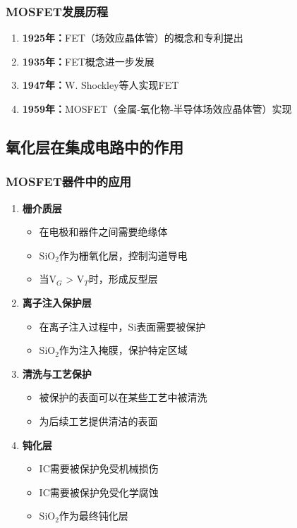 \documentclass[UTF8,12pt,a4paper]{ctexart}
\begin{document}
\subsubsection{MOSFET发展历程}

\begin{enumerate}
    \item \textbf{1925年：}FET（场效应晶体管）的概念和专利提出
    \item \textbf{1935年：}FET概念进一步发展
    \item \textbf{1947年：}W. Shockley等人实现FET
    \item \textbf{1959年：}MOSFET（金属-氧化物-半导体场效应晶体管）实现
\end{enumerate}

\subsection{氧化层在集成电路中的作用}

\subsubsection{MOSFET器件中的应用}

\begin{enumerate}
    \item \textbf{栅介质层}
    \begin{itemize}
        \item 在电极和器件之间需要绝缘体
        \item SiO$_2$作为栅氧化层，控制沟道导电
        \item 当V$_G$ > V$_T$时，形成反型层
    \end{itemize}
    
    \item \textbf{离子注入保护层}
    \begin{itemize}
        \item 在离子注入过程中，Si表面需要被保护
        \item SiO$_2$作为注入掩膜，保护特定区域
    \end{itemize}
    
    \item \textbf{清洗与工艺保护}
    \begin{itemize}
        \item 被保护的表面可以在某些工艺中被清洗
        \item 为后续工艺提供清洁的表面
    \end{itemize}
    
    \item \textbf{钝化层}
    \begin{itemize}
        \item IC需要被保护免受机械损伤
        \item IC需要被保护免受化学腐蚀
        \item SiO$_2$作为最终钝化层
    \end{itemize}
\end{enumerate}
\end{document}
